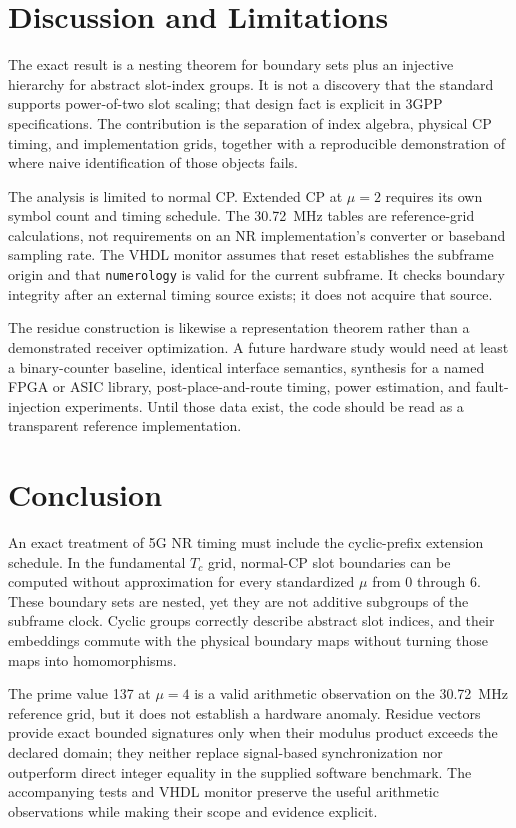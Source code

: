 \documentclass[11pt]{article}
\begin{document}
\section{Discussion and Limitations}

The exact result is a nesting theorem for boundary sets plus an injective hierarchy for abstract slot-index groups.  It is not a discovery that the standard supports power-of-two slot scaling; that design fact is explicit in 3GPP specifications.  The contribution is the separation of index algebra, physical CP timing, and implementation grids, together with a reproducible demonstration of where naive identification of those objects fails.

The analysis is limited to normal CP.  Extended CP at $\mu=2$ requires its own symbol count and timing schedule.  The 30.72~MHz tables are reference-grid calculations, not requirements on an NR implementation's converter or baseband sampling rate.  The VHDL monitor assumes that reset establishes the subframe origin and that \texttt{numerology} is valid for the current subframe.  It checks boundary integrity after an external timing source exists; it does not acquire that source.

The residue construction is likewise a representation theorem rather than a demonstrated receiver optimization.  A future hardware study would need at least a binary-counter baseline, identical interface semantics, synthesis for a named FPGA or ASIC library, post-place-and-route timing, power estimation, and fault-injection experiments.  Until those data exist, the code should be read as a transparent reference implementation.

\section{Conclusion}

An exact treatment of 5G NR timing must include the cyclic-prefix extension schedule.  In the fundamental $T_c$ grid, normal-CP slot boundaries can be computed without approximation for every standardized $\mu$ from 0 through 6.  These boundary sets are nested, yet they are not additive subgroups of the subframe clock.  Cyclic groups correctly describe abstract slot indices, and their embeddings commute with the physical boundary maps without turning those maps into homomorphisms.

The prime value 137 at $\mu=4$ is a valid arithmetic observation on the 30.72~MHz reference grid, but it does not establish a hardware anomaly.  Residue vectors provide exact bounded signatures only when their modulus product exceeds the declared domain; they neither replace signal-based synchronization nor outperform direct integer equality in the supplied software benchmark.  The accompanying tests and VHDL monitor preserve the useful arithmetic observations while making their scope and evidence explicit.
\end{document}
